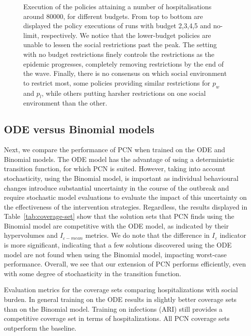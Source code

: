 \documentclass{article}
\begin{document}
\begin{figure}
    \centering
    
    \caption{Execution of the policies attaining a number of hospitalisations around $80000$, for different budgets. From top to bottom are displayed the policy executions of runs with budget 2,3,4,5 and no-limit, respectively. We notice that the lower-budget policies are unable to lessen the social restrictions past the peak. The setting with no budget restrictions finely controls the restrictions as the epidemic progresses, completely removing restrictions by the end of the wave. Finally, there is no consensus on which social environment to restrict most, some policies providing similar restrictions for $p_w$ and $p_l$, while others putting harsher restrictions on one social environment than the other.
    }
    \label{fig:pe-binomial-arh-budgets}
\end{figure}

\subsection{ODE versus Binomial models}
\label{sec:ode-vs-binomial}

Next, we compare the performance of PCN when trained on the ODE and Binomial models. The ODE model has the advantage of using a deterministic transition function, for which PCN is suited. However, taking into account stochasticity, using the Binomial model, is important as individual behavioural changes introduce substantial uncertainty in the course of the outbreak and require stochastic model evaluations to evaluate the impact of this uncertainty on the effectiveness of the intervention strategies. Regardless, the results displayed in Table~\ref{tab:coverage-set} show that the solution sets that PCN finds using the Binomial model are competitive with the ODE model, as indicated by their hypervolumes and $I_{\varepsilon-mean}$ metrics. We do note that the difference in $I_{\varepsilon}$ indicator is more significant, indicating that a few solutions discovered using the ODE model are not found when using the Binomial model, impacting worst-case performance. Overall, we see that our extension of PCN performs efficiently, even with some degree of stochasticity in the transition function.


\begin{table}[t]
  \centering
  \setlength{\tabcolsep}{0.5em} %
  {\renewcommand{\arraystretch}{1.2}%
  
  }
  \caption{Evaluation metrics for the coverage sets comparing hospitalizations with social burden. In general training on the ODE results in slightly better coverage sets than on the Binomial model. Training on infections (ARI) still provides a competitive coverage set in terms of hospitalizations. All PCN coverage sets outperform the baseline.}
  \label{tab:coverage-set}
\end{table}
\end{document}

